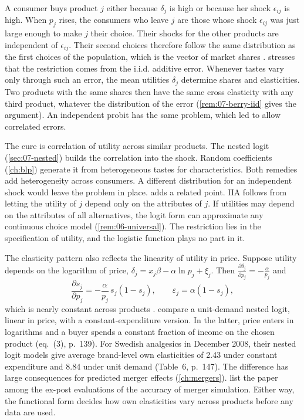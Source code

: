 A consumer buys product $j$ either because $\delta_j$ is high or because her shock $\epsilon_{ij}$ is high.
When $p_j$ rises, the consumers who leave $j$ are those whose shock $\epsilon_{ij}$ was just large enough to make
$j$ their choice. Their shocks for the other products are independent of $\epsilon_{ij}$. Their second choices
therefore follow the same distribution as the first choices of the population, which is the vector of market
shares \citep[p.~523]{Nevo2000a}. \citet[p.~246]{Berry1994} stresses that the restriction comes from the i.i.d.
additive error. Whenever tastes vary only through such an error, the mean utilities $\delta_j$ determine shares
and elasticities. Two products with the same shares then have the same cross elasticity with any third product,
whatever the distribution of the error (\cref{rem:07-berry-iid} gives the argument). An independent probit has
the same problem, which led \citet{HausmanWise1978} to allow correlated errors.

The cure is correlation of utility across similar products. The nested logit (\cref{sec:07-nested}) builds the
correlation into the shock. Random coefficients (\cref{ch:blp}) generate it from heterogeneous tastes for
characteristics. Both remedies add heterogeneity across consumers. A different distribution for an
independent shock would leave the problem in place. \citet[pp.~1414--1415]{McFadden1984} adds a related point.
IIA follows from letting the utility of $j$ depend only on the attributes of $j$. If utilities may depend on the
attributes of all alternatives, the logit form can approximate any continuous choice model
(\cref{rem:06-universal}). The restriction lies in the specification of utility, and the logistic function
plays no part in it.

The elasticity pattern also reflects the linearity of utility in price. Suppose utility depends on the
logarithm of price, $\delta_j = x_j\beta - \alpha\ln p_j + \xi_j$. Then $\frac{\partial \delta_j}{\partial p_j} =
-\frac{\alpha}{p_j}$ and
\begin{equation*}
  \frac{\partial s_j}{\partial p_j} = -\frac{\alpha}{p_j}\,s_j(1 - s_j), \qquad
  \varepsilon_j = \alpha(1 - s_j),
\end{equation*}
which is nearly constant across products \citep[pp.~522--523]{Nevo2000a}. \citet{BjornerstedtVerboven2016}
compare a unit-demand nested logit, linear in price, with a constant-expenditure version. In the latter, price
enters in logarithms and a buyer spends a constant fraction of income on the chosen product (eq.~(3), p.~139).
For Swedish analgesics in December 2008, their nested logit models give average brand-level own elasticities of
2.43 under constant expenditure and 8.84 under unit demand (Table~6, p.~147). The difference has large consequences
for predicted merger effects (\cref{ch:mergers}).
\citet[p.~231]{AskerNocke2021} list the paper among the ex-post evaluations of the accuracy of merger simulation.
Either way, the functional form decides how own elasticities vary across products before any data are used.

